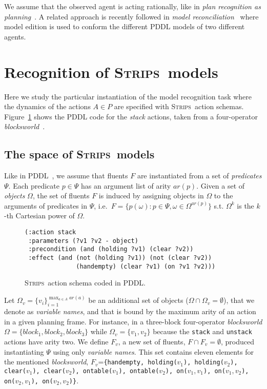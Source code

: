 \documentclass[letterpaper]{article} %
\newcommand{\strips}{\textsc{Strips}}     %
\begin{document}
We assume that the observed agent is acting rationally, like in {\em plan recognition as planning}~\cite{ramirez2012plan,ramirez2009plan}. A related approach is recently followed in {\em model reconciliation}~\cite{Kambhampati:mreconciliation:ijcai17} where model edition is used to conform the different PDDL models of two different agents. 


\section{Recognition of \strips\ models}
\label{sec:asPlanning}
Here we study the particular instantiation of the model recognition task where the dynamics of the actions $A\in P$ are specified with \strips\ action schemas. Figure~\ref{fig:stack} shows the PDDL code for the {\em stack} actions, taken from a four-operator {\em blocksworld}~\cite{slaney2001blocks}. 

\subsection{The space of \strips\ models}
Like in PDDL~\cite{mcdermott1998pddl,fox2003pddl2}, we assume that fluents $F$ are instantiated from a set of {\em predicates} $\Psi$. Each predicate $p\in\Psi$ has an argument list of arity $ar(p)$. Given a set of {\em objects} $\Omega$, the set of fluents $F$ is induced by assigning objects in $\Omega$ to the arguments of predicates in $\Psi$, i.e.~$F=\{p(\omega):p\in\Psi,\omega\in\Omega^{ar(p)}\}$ s.t. $\Omega^k$ is the $k$-th Cartesian power of $\Omega$. 
\begin{figure}
\begin{scriptsize}
\begin{verbatim}
(:action stack
 :parameters (?v1 ?v2 - object)
 :precondition (and (holding ?v1) (clear ?v2))
 :effect (and (not (holding ?v1)) (not (clear ?v2))
              (handempty) (clear ?v1) (on ?v1 ?v2)))
\end{verbatim}
\end{scriptsize}
 \caption{\small \strips\ action schema coded in PDDL.}
\label{fig:stack}
\end{figure}

Let $\Omega_v=\{v_i\}_{i=1}^{\operatorname*{max}_{a\in A} ar(a)}$ be an additional set of objects ($\Omega\cap\Omega_v=\emptyset$), that we denote as {\em variable names}, and that is bound by the maximum arity of an action in a given planning frame. For instance, in a three-block four-operator {\em blocksworld} $\Omega=\{block_1, block_2, block_3\}$ while $\Omega_v=\{v_1, v_2\}$ because the {\small\tt stack} and {\small\tt unstack} actions have arity two. We define $F_v$, a new set of fluents, $F\cap F_v=\emptyset$, produced instantiating $\Psi$ using only {\em variable names}. This set contains eleven elements for the mentioned {\em blocksworld}, $F_v$={\small\tt\{handempty, holding($v_1$), holding($v_2$), clear($v_1$), clear($v_2$), ontable($v_1$), ontable($v_2$), on($v_1,v_1$), on($v_1,v_2$), on($v_2,v_1$), on($v_2,v_2$)\}}.
\end{document}
